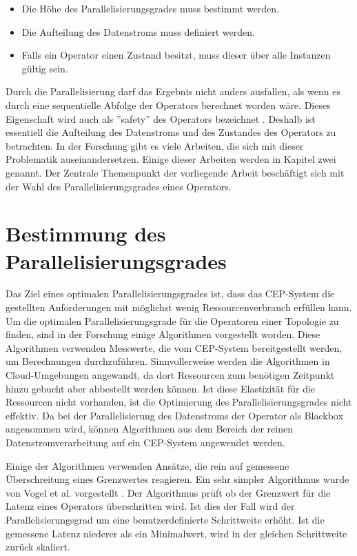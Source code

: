 \begin{itemize}
\item{Die Höhe des Parallelisierungsgrades muss bestimmt werden.}
\item{Die Aufteilung des Datenstroms muss definiert werden.}
\item{Falls ein Operator einen Zustand besitzt, muss dieser über alle Instanzen gültig sein.}
\end{itemize}

Durch die Parallelisierung darf das Ergebnis nicht anders ausfallen, als wenn es durch eine sequentielle Abfolge der Operators berechnet worden wäre.
Dieses Eigenschaft wird auch als ''safety'' des Operators bezeichnet \cite{gedik_elastic_2014}.
Deshalb ist essentiell die Aufteilung des Datenstroms und des Zustandes des Operators zu betrachten.
In der Forschung gibt es viele Arbeiten, die sich mit dieser Problematik auseinandersetzen.
Einige dieser Arbeiten werden in Kapitel zwei genannt.
Der Zentrale Themenpunkt der vorliegende Arbeit beschäftigt sich mit der Wahl des Parallelisierungsgrades eines Operators.

\section{Bestimmung des Parallelisierungsgrades}

Das Ziel eines optimalen Parallelisierungsgrades ist, dass das CEP-System die gestellten Anforderungen mit möglichst wenig Ressourcenverbrauch erfüllen kann.
Um die optimalen Parallelisierungsgrade für die Operatoren einer Topologie zu finden, sind in der Forschung einige Algorithmen vorgestellt worden.
Diese Algorithmen verwenden Messwerte, die vom CEP-System bereitgestellt werden, um Berechnungen durchzuführen.
Sinnvollerweise werden die Algorithmen in Cloud-Umgebungen angewandt, da dort Ressourcen zum benötigen Zeitpunkt hinzu gebucht aber abbestellt werden können.
Ist diese Elastizität für die Ressourcen nicht vorhanden, ist die Optimierung des Parallelisierungsgrades nicht effektiv.
Da bei der Parallelisierung des Datenstroms der Operator als Blackbox angenommen wird, können Algorithmen aus dem Bereich der reinen Datenstromverarbeitung auf ein CEP-System angewendet werden.

Einige der Algorithmen verwenden Ansätze, die rein auf gemessene Überschreitung eines Grenzwertes reagieren.
Ein sehr simpler Algorithmus wurde von Vogel et al. vorgestellt \cite{vogel_autonomic_nodate}.
Der Algorithmus prüft ob der Grenzwert für die Latenz eines Operators überschritten wird.
Ist dies der Fall wird der Parallelisierungsgrad um eine benutzerdefinierte Schrittweite erhöht.
Ist die gemessene Latenz niederer als ein Minimalwert, wird in der gleichen Schrittweite zurück skaliert.

